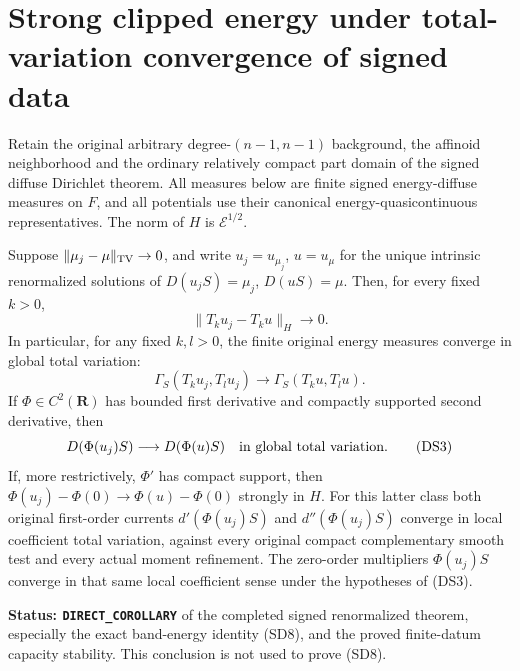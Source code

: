 \section{Strong clipped energy under total-variation convergence of signed data}
\label{sec:r11-signed-data-strong-clipping}

Retain the original arbitrary degree-$(n-1,n-1)$ background,
the affinoid neighborhood and the ordinary relatively compact
part domain of the signed diffuse Dirichlet theorem.  All
measures below are finite signed energy-diffuse measures on
$F$, and all potentials use their canonical energy-quasicontinuous
representatives.  The norm of $H$ is $\mathcal E^{1/2}$.

\begin{theorem}
\label{thm:r11-signed-data-strong-clipping}
Suppose $\|\mu_j-\mu\|_{\rm TV}\to0$, and write
$u_j=u_{\mu_j}$, $u=u_\mu$ for the unique intrinsic
renormalized solutions of $D(u_jS)=\mu_j$, $D(uS)=\mu$.
Then, for every fixed $k>0$,
\[
                    \|T_ku_j-T_ku\|_H\longrightarrow0.
 \tag{DS1}
\]
In particular, for any fixed $k,l>0$, the finite original
energy measures converge in global total variation:
\[
 \Gamma_S(T_ku_j,T_lu_j)
               \longrightarrow\Gamma_S(T_ku,T_lu).
 \tag{DS2}
\]
If $\Phi\in C^2(\mathbf R)$ has bounded first derivative
and compactly supported second derivative, then
\[
           D(\Phi(u_j)S)\longrightarrow D(\Phi(u)S)
                       \quad\hbox{in global total variation}.
 \tag{DS3}
\]
If, more restrictively, $\Phi'$ has compact support, then
$\Phi(u_j)-\Phi(0)\to\Phi(u)-\Phi(0)$ strongly in $H$.
For this latter class both original first-order currents
$d'(\Phi(u_j)S)$ and $d''(\Phi(u_j)S)$ converge in local
coefficient total variation, against every original compact
complementary smooth test and every actual moment refinement.
The zero-order multipliers $\Phi(u_j)S$ converge in that same
local coefficient sense under the hypotheses of (DS3).
\end{theorem}

\noindent\textbf{Status: \texttt{DIRECT\_COROLLARY}} of
the completed signed renormalized theorem, especially the exact
band-energy identity (SD8), and the proved finite-datum capacity
stability.  This conclusion is not used to prove (SD8).

